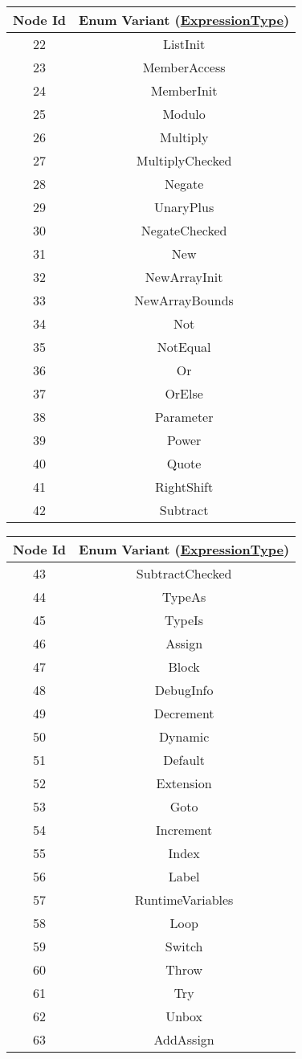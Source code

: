 \documentclass[makeidx]{article}
\begin{document}
\begin{center}
\begin{table}
\begin{tabular}{|c|c|}
\end{tabular}
\begin{tabular}{|c|c|}
Node Id & Enum Variant (\hyperlink{https://docs.microsoft.com/en-us/dotnet/api/system.linq.expressions.expressiontype?view=net-6.0}{ExpressionType}) \\
\hline
22 & ListInit \\
23 & MemberAccess \\
24 & MemberInit \\
25 & Modulo \\
26 & Multiply \\
27 & MultiplyChecked \\
28 & Negate \\
29 & UnaryPlus \\
30 & NegateChecked \\
31 & New \\
32 & NewArrayInit \\
33 & NewArrayBounds \\
34 & Not \\
35 & NotEqual \\
36 & Or \\
37 & OrElse \\
38 & Parameter \\
39 & Power \\
40 & Quote \\
41 & RightShift \\
42 & Subtract \\
\end{tabular}
\begin{tabular}{|c|c|}
Node Id & Enum Variant (\hyperlink{https://docs.microsoft.com/en-us/dotnet/api/system.linq.expressions.expressiontype?view=net-6.0}{ExpressionType}) \\
\hline
43 & SubtractChecked \\
44 & TypeAs \\
45 & TypeIs \\
46 & Assign \\
47 & Block \\
48 & DebugInfo \\
49 & Decrement \\
50 & Dynamic \\
51 & Default \\
52 & Extension \\
53 & Goto \\
54 & Increment \\
55 & Index \\
56 & Label \\
57 & RuntimeVariables \\
58 & Loop \\
59 & Switch \\
60 & Throw \\
61 & Try \\
62 & Unbox \\
63 & AddAssign \\


\end{tabular}
\end{table}
\end{center}
\end{document}

